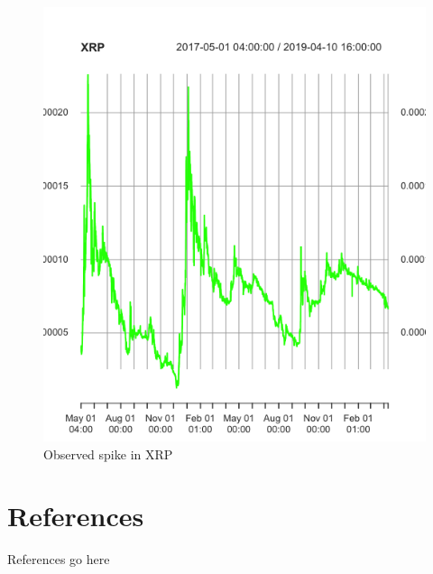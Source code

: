 \documentclass[a4paper,12pt]{article}
\begin{document}
\begin{figure}[htp]
  \centering
  \includegraphics[scale=0.7]{figures/xrp.png}
  \caption{Observed spike in XRP}
  \label{xrp}
\end{figure}

\section{References}
References go here
\end{document}
